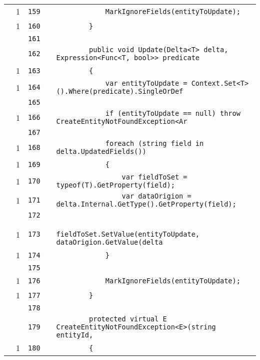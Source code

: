 \documentclass[a4paper,10pt]{article}
\begin{document}
\begin{longtable}[l]{lrrll}
\cellcolor{green} & 1 & \verb~159~ & & \verb~            MarkIgnoreFields(entityToUpdate);~\\
\cellcolor{green} & 1 & \verb~160~ & & \verb~        }~\\
\cellcolor{gray} &  & \verb~161~ & & \verb~~\\
\cellcolor{gray} &  & \verb~162~ & & \verb~        public void Update(Delta<T> delta, Expression<Func<T, bool>> predicate~\\
\cellcolor{green} & 1 & \verb~163~ & & \verb~        {~\\
\cellcolor{green} & 1 & \verb~164~ & & \verb~            var entityToUpdate = Context.Set<T>().Where(predicate).SingleOrDef~\\
\cellcolor{gray} &  & \verb~165~ & & \verb~~\\
\cellcolor{green} & 1 & \verb~166~ & & \verb~            if (entityToUpdate == null) throw CreateEntityNotFoundException<Ar~\\
\cellcolor{gray} &  & \verb~167~ & & \verb~~\\
\cellcolor{green} & 1 & \verb~168~ & & \verb~            foreach (string field in delta.UpdatedFields())~\\
\cellcolor{green} & 1 & \verb~169~ & & \verb~            {~\\
\cellcolor{green} & 1 & \verb~170~ & & \verb~                var fieldToSet = typeof(T).GetProperty(field);~\\
\cellcolor{green} & 1 & \verb~171~ & & \verb~                var dataOrigion = delta.Internal.GetType().GetProperty(field);~\\
\cellcolor{gray} &  & \verb~172~ & & \verb~~\\
\cellcolor{green} & 1 & \verb~173~ & & \verb~                fieldToSet.SetValue(entityToUpdate, dataOrigion.GetValue(delta~\\
\cellcolor{green} & 1 & \verb~174~ & & \verb~            }~\\
\cellcolor{gray} &  & \verb~175~ & & \verb~~\\
\cellcolor{green} & 1 & \verb~176~ & & \verb~            MarkIgnoreFields(entityToUpdate);~\\
\cellcolor{green} & 1 & \verb~177~ & & \verb~        }~\\
\cellcolor{gray} &  & \verb~178~ & & \verb~~\\
\cellcolor{gray} &  & \verb~179~ & & \verb~        protected virtual E CreateEntityNotFoundException<E>(string entityId, ~\\
\cellcolor{green} & 1 & \verb~180~ & & \verb~        {~\\

\end{longtable}
\end{document}

